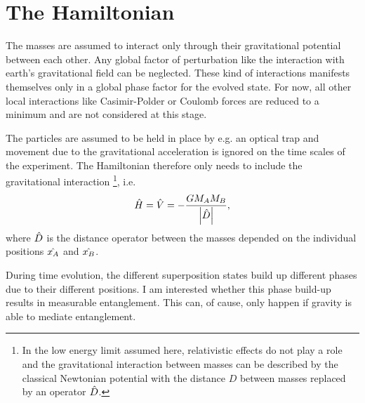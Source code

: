 \section{The Hamiltonian}
The masses are assumed to interact only through their gravitational potential between each other. Any global factor of perturbation like the interaction with earth's gravitational field can be neglected. These kind of interactions manifests themselves only in a global phase factor for the evolved state.
For now, all other local interactions like Casimir-Polder \cite{Casimir_1948} or Coulomb forces are reduced to a minimum and are not considered at this stage.

The particles are assumed to be held in place by e.g. an optical trap and movement due to the gravitational acceleration is ignored on the time scales of the experiment. The Hamiltonian therefore only needs to include the gravitational interaction \footnote{In the low energy limit assumed here, relativistic effects do not play a role and the gravitational interaction between masses can be described by the classical Newtonian potential with the distance $D$ between masses replaced by an operator $\hat{D}$.}, i.e.
\begin{equation}\label{eq:2:hamiltonian}
  \hat{H} = \hat{V} = -\frac{G M_A M_B}{\left\lvert\hat{D}\right\rvert},
\end{equation}
where $\hat{D}$ is the distance operator between the masses depended on the individual positions $\hat{x_A}$ and $\hat{x_B}$.

During time evolution, the different superposition states build up different phases due to their different positions. I am interested whether this phase build-up results in measurable entanglement. This can, of cause, only happen if gravity is able to mediate entanglement.




